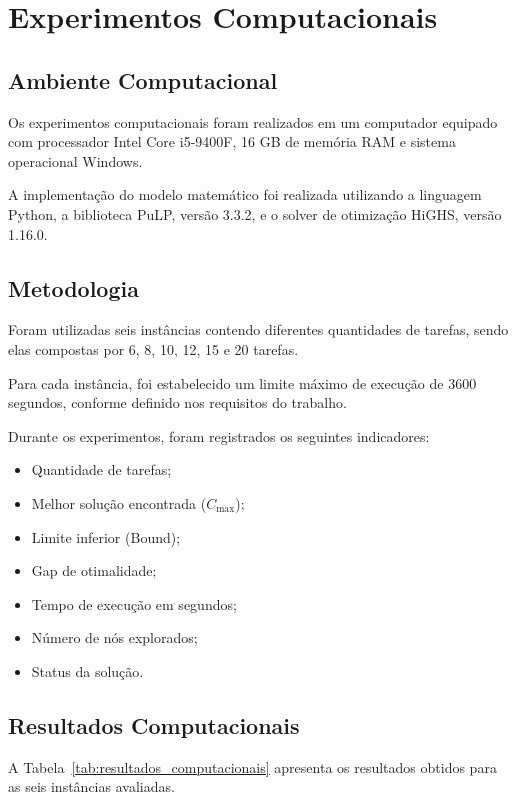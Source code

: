 \section{Experimentos Computacionais}

\subsection{Ambiente Computacional}

Os experimentos computacionais foram realizados em um computador equipado com processador Intel Core i5-9400F, 16 GB de memória RAM e sistema operacional Windows.

A implementação do modelo matemático foi realizada utilizando a linguagem Python, a biblioteca PuLP, versão 3.3.2, e o solver de otimização HiGHS, versão 1.16.0.

\subsection{Metodologia}

Foram utilizadas seis instâncias contendo diferentes quantidades de tarefas, sendo elas compostas por 6, 8, 10, 12, 15 e 20 tarefas.

Para cada instância, foi estabelecido um limite máximo de execução de 3600 segundos, conforme definido nos requisitos do trabalho.

Durante os experimentos, foram registrados os seguintes indicadores:

\begin{itemize}
    \item Quantidade de tarefas;
    \item Melhor solução encontrada ($C_{\max}$);
    \item Limite inferior (Bound);
    \item Gap de otimalidade;
    \item Tempo de execução em segundos;
    \item Número de nós explorados;
    \item Status da solução.
\end{itemize}

\subsection{Resultados Computacionais}

A Tabela~\ref{tab:resultados_computacionais} apresenta os resultados obtidos para as seis instâncias avaliadas.


